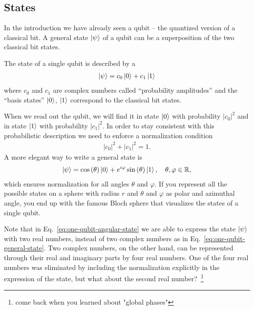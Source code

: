 \subsection{States}
In the introduction we have already seen a qubit -- the quantized version of a classical bit. A general state $\ket{\psi}$ of a qubit can be a superposition of the two classical bit states.
\begin{def*}
The state of a single qubit is described by a
\begin{align}
  \ket{\psi} = c_0\ket{0} + c_1\ket{1}\label{eq:one-qubit-general-state}
\end{align}
where $c_0$ and $c_1$ are complex numbers called ``probability amplitudes'' and the ``basis states'' $\ket{0}$, $\ket{1}$ correspond to the classical bit states.
\end{def*}
When we read out the qubit, we will find it in state $\ket{0}$ with probability $|c_0|^2$ and in state $\ket{1}$ with probability $|c_1|^2$. In order to stay consistent with this probabilistic description we need to enforce a normalization condition
\begin{align}
    |c_0|^2 + |c_1|^2 = 1.
\end{align}
A more elegant way to write a general state is
\begin{align}
    \ket{\psi} = \cos\left({\theta}\right)\ket{0} + e^{i\varphi}\sin\left({\theta}\right)\ket{1},\quad \theta,\varphi \in \mathbb{R},\label{eq:one-qubit-angular-state}
\end{align}
which ensures normalization for all angles $\theta$ and $\varphi$. If you represent all the possible states on a sphere with radius $r$ and $\theta$ and $\varphi$ as polar and azimuthal angle, you end up with the famous Bloch sphere that visualizes the states of a single qubit.

\noindent
Note that in Eq.~\eqref{eq:one-qubit-angular-state} we are able to express the state $\ket{\psi}$ with two real numbers, instead of two complex numbers as in Eq.~\eqref{eq:one-qubit-general-state}. Two complex numbers, on the other hand, can be represented through their real and imaginary parts by four real numbers. One of the four real numbers was eliminated by including the normalization explicitly in the expression of the state, but what about the second real number?~\footnote{come back when you learned about "global phases"}

